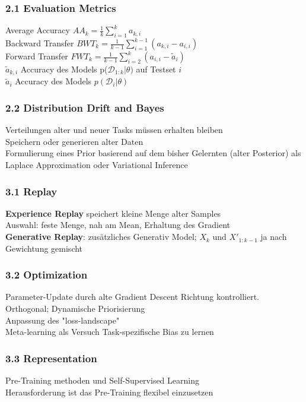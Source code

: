 \documentclass{beamer}
\begin{document}
\begin{frame}
	\frametitle{2.1 Evaluation Metrics}
	Average Accuracy $AA_k=\frac{1}{k}\sum_{i=1}^{k}a_{k,i}$
	\\
	\vspace{0.5cm}
	Backward Transfer $BWT_k = \frac{1}{k-1}\sum_{i=1}^{k-1}(a_{k,i}-a_{i,i})$
	\\
	\vspace{0.5cm}
	Forward Transfer $FWT_k = \frac{1}{k-1}\sum_{i=2}^{k}(a_{i,i}-\tilde{a}_i)$
	\\
	\vspace{1cm}
	$\tilde{a}_{k,i}$ Accuracy des Models p($\mathcal{D}_{1:k}|\theta)$ auf Testset $i$
	\\
	$\tilde{a}_i$ Accuracy des Models $p(\mathcal{D}_i|\theta)$
\end{frame}
\begin{frame}
	\frametitle{2.2 Distribution Drift and Bayes}
	Verteilungen alter und neuer Tasks müssen erhalten bleiben
	\\
	\vspace{0.5cm}
	Speichern oder generieren alter Daten
	\\
	\vspace{0.5cm}
	Formulierung eines Prior basierend auf dem bisher Gelernten (alter Posterior)
	als Laplace Approximation oder Variational Inference
\end{frame}
\begin{frame}
	\frametitle{3.1 Replay}
	\textbf{Experience Replay} speichert kleine Menge alter Samples
	\\
	Auswahl: feste Menge, nah am Mean, Erhaltung des Gradient
	\\
	\vspace{0.5cm}
	\textbf{Generative Replay}: zusätzliches Generativ Model; $X_k$ und $X'_{1:k-1}$ ja nach Gewichtung gemischt
\end{frame}
\begin{frame}
	\frametitle{3.2 Optimization}
	Parameter-Update durch alte Gradient Descent Richtung kontrolliert.
	\\
	Orthogonal; Dynamische Priorisierung
	\\
	\vspace{0.5cm}
	Anpassung des "loss-landscape"
	\\
	\vspace{0.5cm}
	Meta-learning als Versuch Task-spezifische Bias zu lernen
\end{frame}
\begin{frame}
	\frametitle{3.3 Representation}
	Pre-Training methoden und Self-Supervised Learning
	\\
	Herausforderung ist das Pre-Training flexibel einzusetzen 
\end{frame}
\end{document}

